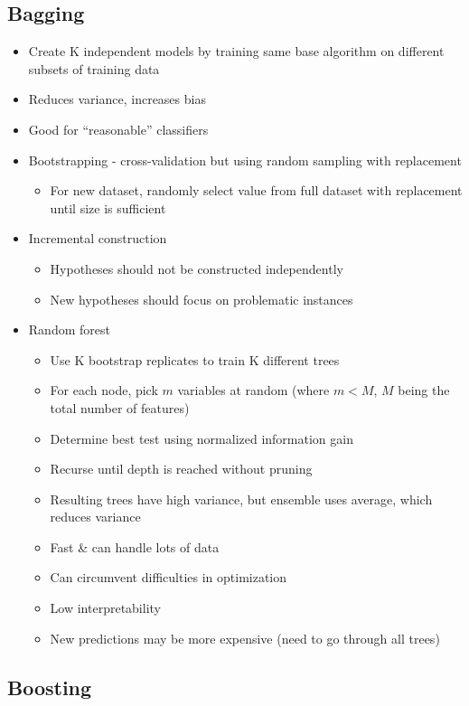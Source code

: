 \documentclass[12pt]{article}
\begin{document}
\subsection{Bagging}

\begin{itemize}
	\item Create K independent models by training same base algorithm on different subsets of training data
	\item Reduces variance, increases bias
	\item Good for ``reasonable'' classifiers
	\item Bootstrapping - cross-validation but using random sampling with replacement
	\begin{itemize}
		\item For new dataset, randomly select value from full dataset with replacement until size is sufficient
	\end{itemize}
	\item Incremental construction
	\begin{itemize}
		\item Hypotheses should not be constructed independently
		\item New hypotheses should focus on problematic instances
	\end{itemize}
	\item Random forest
	\begin{itemize}
		\item Use K bootstrap replicates to train K different trees
		\item For each node, pick $m$ variables at random (where $m < M$, $M$ being the total number of features)
		\item Determine best test using normalized information gain
		\item Recurse until depth is reached without pruning
		\item Resulting trees have high variance, but ensemble uses average, which reduces variance
		\item Fast \& can handle lots of data 
		\item Can circumvent difficulties in optimization
		\item Low interpretability
		\item New predictions may be more expensive (need to go through all trees)
	\end{itemize}
\end{itemize}

\subsection{Boosting}
\end{document}
